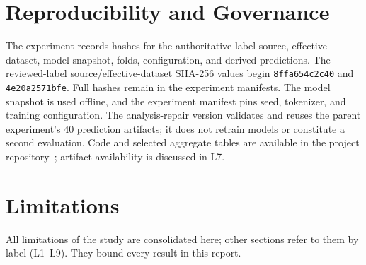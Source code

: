 \documentclass[12pt,a4paper,oneside]{report}
\begin{document}
\section{Reproducibility and Governance}

The experiment records hashes for the authoritative label source, effective dataset, model snapshot, folds, configuration, and derived predictions. The reviewed-label source/effective-dataset SHA-256 values begin \texttt{8ffa654c2c40} and \texttt{4e20a2571bfe}. Full hashes remain in the experiment manifests. The model snapshot is used offline, and the experiment manifest pins seed, tokenizer, and training configuration. The analysis-repair version validates and reuses the parent experiment's 40 prediction artifacts; it does not retrain models or constitute a second evaluation. Code and selected aggregate tables are available in the project repository~\cite{artifact2026}; artifact availability is discussed in L7.

\section{Limitations}
\label{sec:limitations}

All limitations of the study are consolidated here; other sections refer to them by label (L1--L9). They bound every result in this report.
\end{document}
